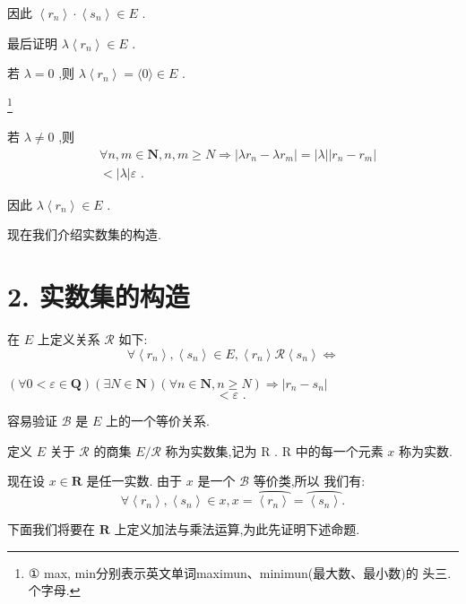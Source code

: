 因此 $\left\langle  {r}_{n}\right\rangle   \cdot  \left\langle  {s}_{n}\right\rangle   \in  E$ .

最后证明 $\lambda \left\langle  {r}_{n}\right\rangle   \in  E$ .

若 $\lambda  = 0$ ,则 $\lambda \left\langle  {r}_{n}\right\rangle   = \langle 0\rangle  \in  E$ .

\footnote{
	
	① max, min分别表示英文单词maximun、minimun(最大数、最小数)的 头三. 个字母.
	
}

若 $\lambda  \neq  0$ ,则
\begin{align*}
	&\forall n,m \in  \mathbf{N},n,m \geq  N \Rightarrow  \left| {\lambda {r}_{n} - \lambda {r}_{m}}\right|  = \left| \lambda \right| \left| {{r}_{n} - {r}_{m}}\right|\\
	&< \left| \lambda \right| \varepsilon \text{ . }
\end{align*}

因此 $\lambda \left\langle  {r}_{n}\right\rangle   \in  E$ .

现在我们介绍实数集的构造.

\section*{2. 实数集的构造}

在 $E$ 上定义关系 $\mathcal{R}$ 如下:
$$\forall \left\langle  {r}_{n}\right\rangle  ,\left\langle  {s}_{n}\right\rangle   \in  E,\left\langle  {r}_{n}\right\rangle  \mathcal{R}\left\langle  {s}_{n}\right\rangle   \Leftrightarrow$$

$\left( {\forall 0 < \varepsilon  \in  \mathbf{Q}}\right) \left( {\exists N \in  \mathbf{N}}\right) \left( {\forall n \in  \mathbf{N},n \geq  N}\right)  \Rightarrow  \left| {{r}_{n} - {s}_{n}}\right|$
$$< \varepsilon \text{ . }$$

容易验证 $\mathcal{B}$ 是 $E$ 上的一个等价关系.

定义 $E$ 关于 $\mathcal{R}$ 的商集 $E/\mathcal{R}$ 称为实数集,记为 $\mathrm{R}$ . $\mathrm{R}$ 中的每一个元素 $x$ 称为实数.

现在设 $x \in  \mathbf{R}$ 是任一实数. 由于 $x$ 是一个 $\mathcal{B}$ 等价类,所以 我们有:
$$\forall \left\langle  {r}_{n}\right\rangle  ,\left\langle  {s}_{n}\right\rangle   \in  x,x = \overset{⏜}{\left\langle  {r}_{n}\right\rangle  } = \overset{⏜}{\left\langle  {s}_{n}\right\rangle  }.$$

下面我们将要在 $\mathbf{R}$ 上定义加法与乘法运算,为此先证明下述命题.

